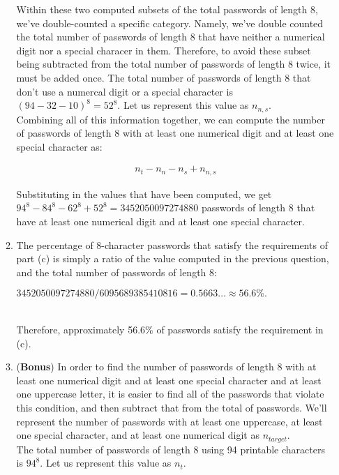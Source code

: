 \documentclass[11pt]{article}
\theoremstyle{definition}
\begin{document}
\begin{enumerate}
\begin{enumerate}
Within these two computed subsets of the total passwords of length 8, we've double-counted a specific category. 
Namely, we've double counted the total number of passwords of length 8 that have neither a numerical digit nor a special characer in them. 
Therefore, to avoid these subset being subtracted from the total number of passwords of length 8 twice, it must be added once. The total number of passwords of 
length 8 that don't use a numercal digit or a special character is $(94 - 32 - 10)^8 = 52^8$. Let us represent this value as $n_{n,s}$.\\ 

Combining all of this information together, we can compute the number of passwords of length 8 with at least one numerical digit and at least one special character as:

\begin{align*}
n_t - n_n - n_s + n_{n,s}
\end{align*}

Substituting in the values that have been computed, we get $94^8 - 84^8 - 62^8 + 52^8 = 3452050097274880$ passwords of length 8 that have at least one numerical digit and at least one special character.\\

\item The percentage of 8-character passwords that satisfy the requirements of part (c) is simply a ratio of the value computed in the previous question, and the total number of passwords
of length 8:\\
\centerline{$3452050097274880/6095689385410816 = 0.5663\ldots \approx 56.6\%.$}\\

Therefore, approximately 56.6\% of passwords satisfy the requirement in (c).\\

\item (\textbf{Bonus}) In order to find the number of passwords of length 8 with at least one numerical digit and at least one special character and at least one uppercase letter, it is easier to find
all of the passwords that violate this condition, and then subtract that from the total of passwords. We'll represent the number of passwords with at least one uppercase, at least one special character, and
at least one numerical digit as $n_{target}$.\\

The total number of passwords of length 8 using 94 printable characters is $94^8$. Let us represent this value as $n_{t}$.\\


\end{enumerate}
\end{enumerate}
\end{document}
